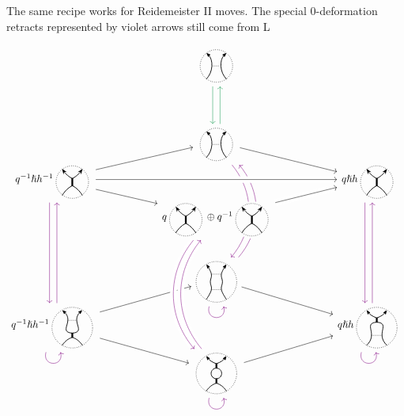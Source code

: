 \documentclass{article}
\theoremstyle{plain} %
\theoremstyle{definition} %
\theoremstyle{remark} %
\begin{document}
The same recipe works for Reidemeister II moves. The special 0-deformation retracts represented by violet arrows still come from L

\[\label{r2asdr}
\begin{tikzcd}[row sep=-0.1cm, column sep=2cm]
	&
	\scalebox{0.7}{\ThinEdge{}{}{}{}}
	\arrow[d, color=ForestGreen, shift right=1.5]
	&
	\\[4em]&
	\scalebox{0.7}{\ThinEdge{}{}{}{}}
	\arrow[dr]
	\arrow[ddd, bend left=40, color=violet, shift right=1.5, dash pattern=on 40pt off 35pt]
	\arrow[leftarrow, ddd, bend left=40, color=violet, shift left=1.5, dash pattern=on 39.5pt off 37pt]
	\arrow[u, color=ForestGreen, shift right=1.5]
	&
	\\
	q^{-1}\hslash h^{-1}\scalebox{0.7}{\ThickEdge{}{}{}{}} 
	\arrow[dr]
	\arrow[ur]
	\arrow[ddd, color=violet, shift right=1.5]
	&
	&
	q\hslash h\scalebox{0.7}{\ThickEdge{}{}{}{}}
	\arrow[ddd, color=violet, shift right=1.5]
	\\
	& 
	q\scalebox{0.7}{\ThickEdge{}{}{}{}}\oplus q^{-1}\scalebox{0.7}{\ThickEdge{}{}{}{}}
	\arrow[ur, crossing over] 
	&
	\\[2em]
	& 
	\scalebox{0.7}{\ThinThin{}{}{}{}{}}
	\arrow[loop right, distance=1.5em, in=-75, out=-105, color=violet]
	\arrow[dr]
	&
	\\
	q^{-1}\hslash h^{-1}\scalebox{0.7}{\ThinThick{}{}{}{}{}} 
	\arrow[loop right, distance=1.5em, in=-75, out=-105, color=violet]
	\arrow[ur]
	\arrow[dr]
	\arrow[uuu, color=violet, shift right=1.5]
	&& 
	q\hslash h\scalebox{0.7}{\ThickThin{}{}{}{}{}}
	\arrow[uuu, color=violet, shift right=1.5]
	\arrow[loop right, distance=1.5em, in=-75, out=-105, color=violet]
	\\
	& 
	\scalebox{0.7}{\Bigon{}{}{}{}{}} 
	\arrow[ur]
	\arrow[loop right, distance=1.5em, in=-75, out=-105, color=violet] 
	&
	\arrow[ddd, from=4-2, to=7-2, bend right=40, crossing over, color=violet, shift right=1.5] 
	\arrow[uuu, from=7-2, to=4-2, bend left=40, crossing over, color=violet, shift right=1.5] 
	\arrow[ur, from=4-2, to=3-3, crossing over] 
	\arrow[rr, from=3-1, to=3-3, crossing over] 
\end{tikzcd}
\]
\end{document}
